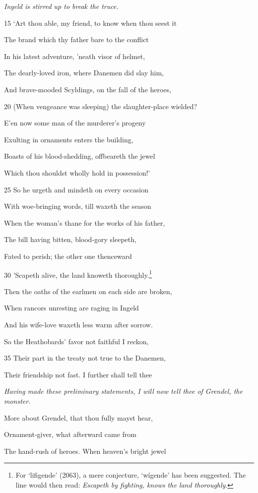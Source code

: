 \emph{Ingeld is stirred up
to break the truce.}

15
‘Art thou able, my friend, to know when thou seest it

The brand which thy father bare to the conflict

In his latest adventure, ’neath visor of helmet,

The dearly-loved iron, where Danemen did slay him,

And brave-mooded Scyldings, on the fall of the heroes,

20
(When vengeance was sleeping) the slaughter-place wielded?

E’en now some man of the murderer’s progeny

Exulting in ornaments enters the building,

Boasts of his blood-shedding, offbeareth the jewel

Which thou shouldst wholly hold in possession!’

25
So he urgeth and mindeth on every occasion

With woe-bringing words, till waxeth the season

When the woman’s thane for the works of his father,

The bill having bitten, blood-gory sleepeth,

Fated to perish; the other one thenceward

30
’Scapeth alive, the land knoweth thoroughly.\footnote{For ‘lifigende’ (2063), a mere conjecture, ‘wígende’ has been suggested.
The line would then read: \emph{Escapeth by fighting, knows the land thoroughly}.}

Then the oaths of the earlmen on each side are broken,

When rancors unresting are raging in Ingeld

And his wife-love waxeth less warm after sorrow.

So the Heathobards’ favor not faithful I reckon,

35
Their part in the treaty not true to the Danemen,

Their friendship not fast. I further shall tell thee

\emph{Having made these
preliminary statements,
I will now
tell thee of Grendel,
the monster.}

More about Grendel, that thou fully mayst hear,

Ornament-giver, what afterward came from

The hand-rush of heroes. When heaven’s bright jewel

